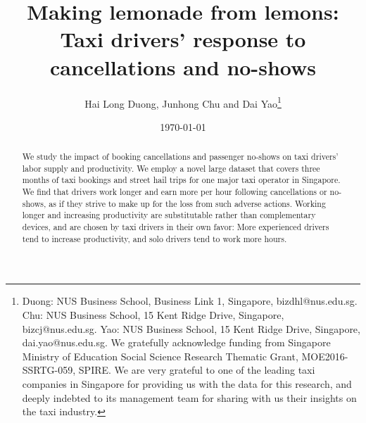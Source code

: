 \documentclass[reviewmode]{AEA}
\begin{document}
\title{Making lemonade from lemons: Taxi drivers' response to cancellations and no-shows}
\author{Hai Long Duong, Junhong Chu and Dai Yao\thanks{Duong: NUS Business School, Business Link 1, Singapore, bizdhl@nus.edu.sg. Chu: NUS Business School, 15 Kent Ridge Drive, Singapore, bizcj@nus.edu.sg. Yao: NUS Business School, 15 Kent Ridge Drive, Singapore, dai.yao@nus.edu.sg. We gratefully acknowledge funding from Singapore Ministry of Education Social Science Research Thematic Grant, MOE2016-SSRTG-059, SPIRE. We are very grateful to one of the leading taxi companies in Singapore for providing us with the data for this research, and deeply indebted to its management team for sharing with us their insights on the taxi industry.}}
\date{\today}
\pubMonth{}
\pubYear{}
\pubVolume{}
\pubIssue{}
\Keywords{}

\begin{abstract}
	We study the impact of booking cancellations and passenger no-shows on taxi drivers' labor supply and productivity. We employ a novel large dataset that covers three months of taxi bookings and street hail trips for one major taxi operator in Singapore. We find that drivers work longer and earn more per hour following cancellations or no-shows, as if they strive to make up for the loss from such adverse actions. Working longer and increasing productivity are substitutable rather than complementary devices, and are chosen by taxi drivers in their own favor: More experienced drivers tend to increase productivity, and solo drivers tend to work more hours. 
\end{abstract}
\end{document}
